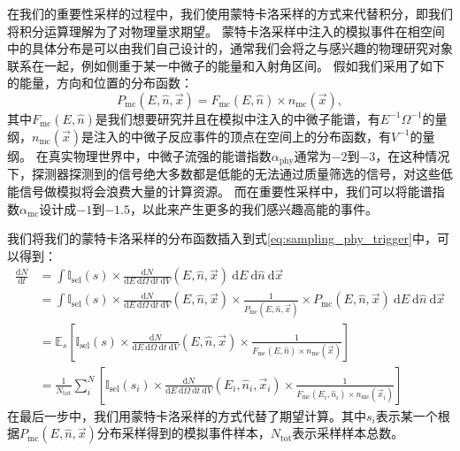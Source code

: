 在我们的重要性采样的过程中，我们使用蒙特卡洛采样的方式来代替积分，即我们将积分运算理解为了对物理量求期望。
蒙特卡洛采样中注入的模拟事件在相空间中的具体分布是可以由我们自己设计的，通常我们会将之与感兴趣的物理研究对象联系在一起，例如侧重于某一中微子的能量和入射角区间。
假如我们采用了如下的能量，方向和位置的分布函数：
\begin{equation}
    P_\mathrm{mc} (E, \hat{n}, \vec{x}) = F_\mathrm{mc} (E, \hat{n}) \times n_\mathrm{mc}(\vec{x}) ,
    \label{eq:sampling_MC_pdf}
\end{equation}
其中$F_\mathrm{mc} (E, \hat{n})$是我们想要研究并且在模拟中注入的中微子能谱，有$E^{-1} \Omega^{-1}$的量纲，$n_\mathrm{mc}(\vec{x})$是注入的中微子反应事件的顶点在空间上的分布函数，有$V^{-1}$的量纲。
在真实物理世界中，中微子流强的能谱指数$\alpha_\mathrm{phy}$通常为$-2$到$-3$，在这种情况下，探测器探测到的信号绝大多数都是低能的无法通过质量筛选的信号，对这些低能信号做模拟将会浪费大量的计算资源。
而在重要性采样中，我们可以将能谱指数$\alpha_\mathrm{mc}$设计成$-1$到$-1.5$，以此来产生更多的我们感兴趣高能的事件。

我们将我们的蒙特卡洛采样的分布函数插入到式\ref{eq:sampling_phy_trigger}中，可以得到：
\begin{equation}
\begin{aligned}
    \frac{\mathrm{d}N}{\mathrm{d}t} &= 
    \int \mathbb{I}_\mathrm{sel}(s) \times 
    \frac{\mathrm{d}N}{\mathrm{d}E ~\mathrm{d}\Omega ~\mathrm{d}t ~\mathrm{d}V}(E, \hat{n}, \vec{x}) 
    ~\mathrm{d}E ~\mathrm{d}\hat{n} ~\mathrm{d}\vec{x} \\
    &= \int \mathbb{I}_\mathrm{sel}(s) \times 
    \frac{\mathrm{d}N}{\mathrm{d}E ~\mathrm{d}\Omega ~\mathrm{d}t ~\mathrm{d}V} (E, \hat{n}, \vec{x})
    \times \frac{1}{P_\mathrm{mc} (E, \hat{n}, \vec{x})} \times P_\mathrm{mc} (E, \hat{n}, \vec{x})
    ~\mathrm{d}E ~\mathrm{d}\hat{n} ~\mathrm{d}\vec{x} \\
    &= \mathbb{E}_s \left[ \mathbb{I}_\mathrm{sel}(s) \times 
    \frac{\mathrm{d}N}{\mathrm{d}E ~\mathrm{d}\Omega ~\mathrm{d}t ~\mathrm{d}V} (E, \hat{n}, \vec{x})
    \times \frac{1}{F_\mathrm{mc} (E, \hat{n}) \times n_\mathrm{mc}(\vec{x})}   \right]  \\
    &= \frac{1}{N_\mathrm{tot}} \sum^N_i \left[ 
    \mathbb{I}_\mathrm{sel}(s_i) \times 
    \frac{\mathrm{d}N}{\mathrm{d}E ~\mathrm{d}\Omega ~\mathrm{d}t ~\mathrm{d}V} (E_i, \hat{n}_i, \vec{x}_i)
    \times \frac{1}{F_\mathrm{mc} (E_i, \hat{n}_i) \times n_\mathrm{mc}(\vec{x}_i)} \right]
\end{aligned}
\label{eq:sampling_MC_trigger}
\end{equation}
在最后一步中，我们用蒙特卡洛采样的方式代替了期望计算。其中$s_i$表示某一个根据$P_\mathrm{mc} (E, \hat{n}, \vec{x})$分布采样得到的模拟事件样本，$N_\mathrm{tot}$表示采样样本总数。

